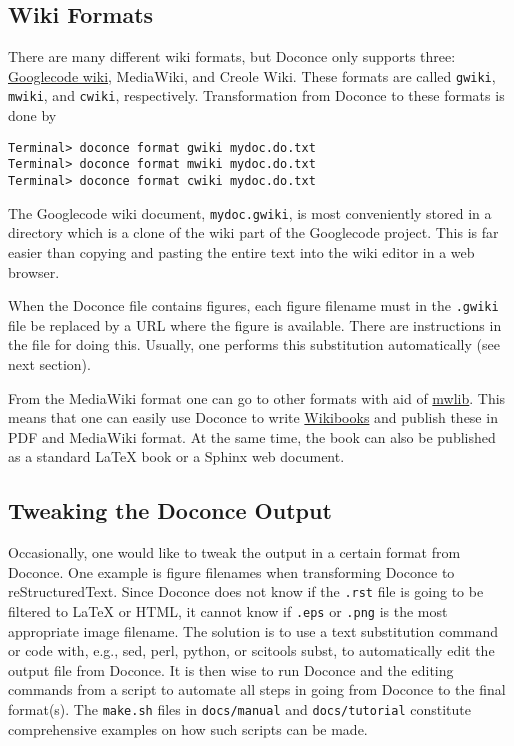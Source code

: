 \documentclass[twoside]{article}
\begin{document}
\subsection{Wiki Formats}

There are many different wiki formats, but Doconce only supports three:
\href{{http://code.google.com/p/support/wiki/WikiSyntax}}{Googlecode wiki}, MediaWiki, and Creole Wiki. These formats are called
{\fontsize{10pt}{10pt}\verb!gwiki!}, {\fontsize{10pt}{10pt}\verb!mwiki!}, and {\fontsize{10pt}{10pt}\verb!cwiki!}, respectively.
Transformation from Doconce to these formats is done by
\vspace{4pt}
\begin{Verbatim}[numbers=none,frame=lines,label=\fbox{{\tiny Terminal}},fontsize=\fontsize{9pt}{9pt},
labelposition=topline,framesep=2.5mm,framerule=0.7pt]
Terminal> doconce format gwiki mydoc.do.txt
Terminal> doconce format mwiki mydoc.do.txt
Terminal> doconce format cwiki mydoc.do.txt
\end{Verbatim}

The Googlecode wiki document, {\fontsize{10pt}{10pt}\verb!mydoc.gwiki!}, is most conveniently stored
in a directory which is a clone of the wiki part of the Googlecode project.
This is far easier than copying and pasting the entire text into the
wiki editor in a web browser.

When the Doconce file contains figures, each figure filename must in
the {\fontsize{10pt}{10pt}\verb!.gwiki!} file be replaced by a URL where the figure is
available. There are instructions in the file for doing this. Usually,
one performs this substitution automatically (see next section).

From the MediaWiki format one can go to other formats with aid
of \href{{http://pediapress.com/code/}}{mwlib}. This means that one can
easily use Doconce to write \href{{http://en.wikibooks.org}}{Wikibooks}
and publish these in PDF and MediaWiki format.
At the same time, the book can also be published as a
standard {\LaTeX} book or a Sphinx web document.

\subsection{Tweaking the Doconce Output}

Occasionally, one would like to tweak the output in a certain format
from Doconce. One example is figure filenames when transforming
Doconce to reStructuredText. Since Doconce does not know if the
{\fontsize{10pt}{10pt}\verb!.rst!} file is going to be filtered to {\LaTeX} or HTML, it cannot know
if {\fontsize{10pt}{10pt}\verb!.eps!} or {\fontsize{10pt}{10pt}\verb!.png!} is the most appropriate image filename.
The solution is to use a text substitution command or code with, e.g., sed,
perl, python, or scitools subst, to automatically edit the output file
from Doconce. It is then wise to run Doconce and the editing commands
from a script to automate all steps in going from Doconce to the final
format(s). The {\fontsize{10pt}{10pt}\verb!make.sh!} files in {\fontsize{10pt}{10pt}\verb!docs/manual!} and {\fontsize{10pt}{10pt}\verb!docs/tutorial!}
constitute comprehensive examples on how such scripts can be made.
\end{document}
